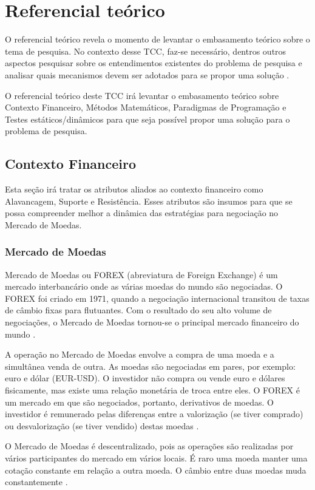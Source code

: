 \chapter{Referencial teórico}

O referencial teórico revela o momento de levantar o embasamento teórico sobre o tema de pesquisa. No contexto desse TCC, faz-se necessário, dentros outros aspectos pesquisar sobre os entendimentos existentes do problema de pesquisa e analisar quais mecanismos devem ser adotados para se propor uma solução \cite{belchior2012}.

O referencial teórico deste TCC irá levantar o embasamento teórico sobre Contexto Financeiro, Métodos Matemáticos, Paradigmas de Programação e Testes estáticos/dinâmicos para que seja possível propor uma solução para o problema de pesquisa.

\section{Contexto Financeiro}
Esta seção irá tratar os atributos aliados ao contexto financeiro como Alavancagem, Suporte e Resistência. Esses atributos são insumos para que se possa compreender melhor a dinâmica das estratégias para negociação no Mercado de Moedas.

\subsection{Mercado de Moedas}
Mercado de Moedas ou FOREX (abreviatura de Foreign Exchange) é um mercado interbancário onde as várias moedas do mundo são negociadas. O FOREX foi criado em 1971, quando a negociação internacional transitou de taxas de câmbio fixas para flutuantes. Com o resultado do seu alto volume de negociações, o Mercado de Moedas tornou-se o principal mercado financeiro do mundo \cite{market2011}.

A operação no Mercado de Moedas envolve a compra de uma moeda e a simultânea venda de outra. As moedas são negociadas em pares, por exemplo: euro e dólar (EUR-USD). O investidor não compra ou vende euro e dólares fisicamente, mas existe uma relação monetária de troca entre eles. O FOREX é um mercado em que são negociados, portanto, derivativos de moedas. O investidor é remunerado pelas diferenças entre a valorização (se tiver comprado) ou desvalorização (se tiver vendido) destas moedas \cite[p.~3]{cvm2009}.

O Mercado de Moedas é descentralizado, pois as operações são realizadas por vários participantes do mercado em vários locais. É raro uma moeda manter uma cotação constante em relação a outra moeda. O câmbio entre duas moedas muda constantemente \cite[p.~5]{fxcm2011}.

